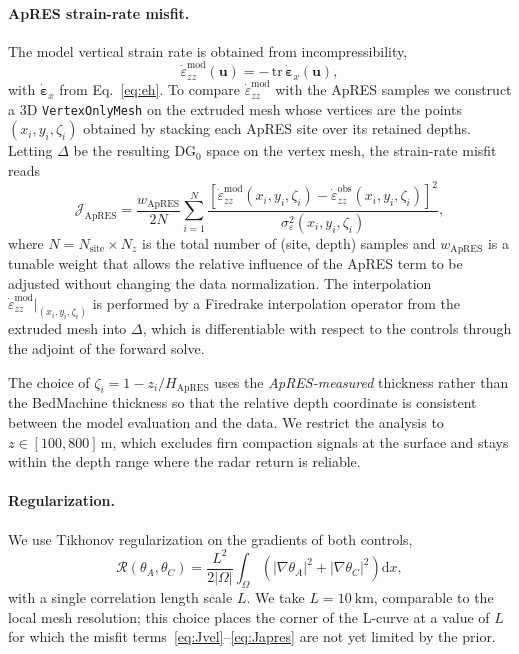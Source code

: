 \paragraph{ApRES strain-rate misfit.} The model vertical
strain rate is obtained from incompressibility,
\begin{equation}
\dot\varepsilon_{zz}^\mathrm{mod}(\bm u) =
   -\,\mathrm{tr}\,\dot{\bm\varepsilon}_x(\bm u),
   \label{eq:eps_zz}
\end{equation}
with $\dot{\bm\varepsilon}_x$ from Eq.~\eqref{eq:eh}. To compare
$\dot\varepsilon_{zz}^\mathrm{mod}$ with the ApRES samples we
construct a 3D \texttt{VertexOnlyMesh} on the extruded mesh whose
vertices are the points $(x_i, y_i, \zeta_i)$ obtained by stacking
each ApRES site over its retained depths. Letting $\Delta$ be
the resulting $\mathrm{DG}_0$ space on the vertex mesh, the
strain-rate misfit reads
\begin{equation}
\mathcal J_\mathrm{ApRES}
  = \frac{w_\mathrm{ApRES}}{2 N}
    \sum_{i=1}^{N}
    \frac{[\dot\varepsilon_{zz}^\mathrm{mod}(x_i,y_i,\zeta_i)
         - \dot\varepsilon_{zz}^\mathrm{obs}(x_i,y_i,\zeta_i)]^2}
         {\sigma_\varepsilon^2(x_i,y_i,\zeta_i)},
   \label{eq:Japres}
\end{equation}
where $N = N_\mathrm{site}\times N_z$ is the total number of
(site, depth) samples and $w_\mathrm{ApRES}$ is a tunable weight that
allows the relative influence of the ApRES term to be adjusted
without changing the data normalization. The interpolation
$\dot\varepsilon_{zz}^\mathrm{mod}\big|_{(x_i,y_i,\zeta_i)}$ is
performed by a Firedrake interpolation operator from the extruded
mesh into $\Delta$, which is differentiable with respect to the
controls through the adjoint of the forward solve.

The choice of $\zeta_i = 1 - z_i / H_\mathrm{ApRES}$ uses the
\emph{ApRES-measured} thickness rather than the BedMachine
thickness so that the relative depth coordinate is consistent
between the model evaluation and the data. We restrict the
analysis to $z\in[100,800]\,\mathrm m$, which excludes firn
compaction signals at the surface and stays within the depth range
where the radar return is reliable.

\paragraph{Regularization.} We use Tikhonov regularization on the
gradients of both controls,
\begin{equation}
\mathcal R(\theta_A,\theta_C)
  = \frac{L^2}{2|\Omega|}\!\int_\Omega
       \left(|\nabla\theta_A|^2 + |\nabla\theta_C|^2\right)\!
       \mathrm d x,
   \label{eq:reg}
\end{equation}
with a single correlation length scale $L$. We take
$L = \SI{10}{\km}$, comparable to the local mesh resolution; this
choice places the corner of the L-curve at a value of $L$ for which
the misfit terms~\eqref{eq:Jvel}--\eqref{eq:Japres} are not yet
limited by the prior.

